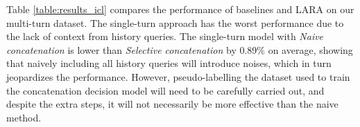 

Table \ref{table:results_icl} compares the performance of baselines and LARA on our multi-turn dataset. The single-turn approach has the worst performance due to the lack of context from history queries. The single-turn model with \emph{Naive concatenation} is lower than \emph{Selective concatenation} by 0.89\% on average, showing that naively including all history queries will introduce noises, which in turn jeopardizes the performance. However, pseudo-labelling the dataset used to train the concatenation decision model will need to be carefully carried out, and despite the extra steps, it will not necessarily be more effective than the naive method. 

